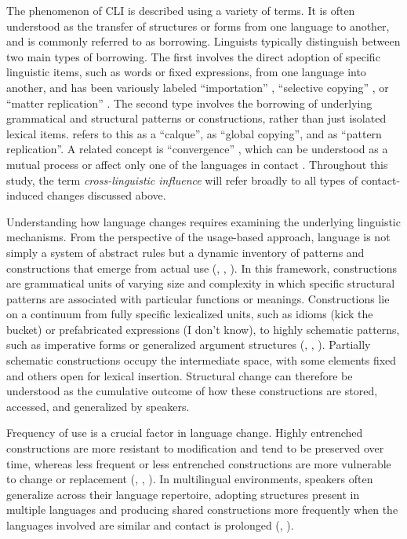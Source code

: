 The phenomenon of CLI is described using a variety of terms. It is often understood as the transfer of structures or forms from one language to another, and is commonly referred to as borrowing. Linguists typically distinguish between two main types of borrowing. The first involves the direct adoption of specific linguistic items, such as words or fixed expressions, from one language into another, and has been variously labeled “importation” \citep{Haugen1950}, “selective copying” \citep{Johanson2002}, or “matter replication” \citep{Matras2020}. The second type involves the borrowing of underlying grammatical and structural patterns or constructions, rather than just isolated lexical items. \citet{Haugen1950} refers to this as a “calque”, \citet{Johanson2002} as “global copying”, and \citet{Matras2020} as “pattern replication”. A related concept is “convergence” \citep{Weirich1953}, which can be understood as a mutual process or affect only one of the languages in contact \citep{Matras2020}. Throughout this study, the term \textit{cross-linguistic influence} will refer broadly to all types of contact-induced changes discussed above.

Understanding how language changes requires examining the underlying linguistic mechanisms. From the perspective of the usage-based approach, language is not simply a system of abstract rules but a dynamic inventory of patterns and constructions that emerge from actual use (\citealt{Bybee2010}, \citealt{langacker_foundations_1987}, \citealt{Dabrowska2019}). In this framework, constructions are grammatical units of varying size and complexity in which specific structural patterns are associated with particular functions or meanings. Constructions lie on a continuum from fully specific lexicalized units, such as idioms (kick the bucket) or prefabricated expressions (I don’t know), to highly schematic patterns, such as imperative forms or generalized argument structures (\citealt{langacker_foundations_1987}, \citealt{Goldberg2006}, \citealt{Nicolai2014}). Partially schematic constructions occupy the intermediate space, with some elements fixed and others open for lexical insertion. Structural change can therefore be understood as the cumulative outcome of how these constructions are stored, accessed, and generalized by speakers.

Frequency of use is a crucial factor in language change. Highly entrenched constructions are more resistant to modification and tend to be preserved over time, whereas less frequent or less entrenched constructions are more vulnerable to change or replacement (\citealt{langacker_foundations_1987}, \citealt{Tomasello2010}, \citealt{HakimovBackus2021}). In multilingual environments, speakers often generalize across their language repertoire, adopting structures present in multiple languages and producing shared constructions more frequently when the languages involved are similar and contact is prolonged (\citealt{Ansaldo2009}, \citealt{Matras2020}).

